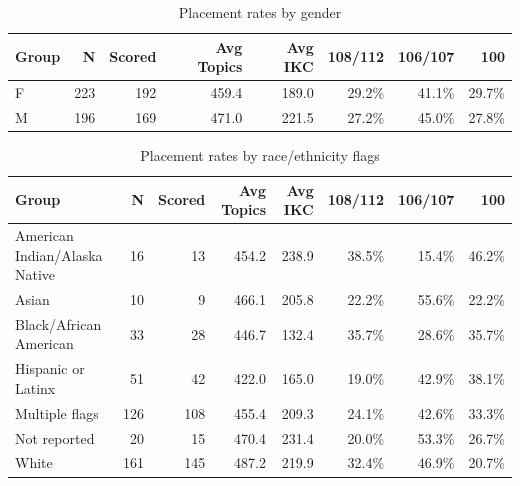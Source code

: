 \documentclass[11pt]{article}
\begin{document}
\begin{table}[htbp]
\centering
\small
\caption{Placement rates by gender}
\begin{tabular}{lrrrrrrr}
\hline
Group & N & Scored & Avg Topics & Avg IKC & 108/112 & 106/107 & 100 \\
\hline
F & 223 & 192 & 459.4 & 189.0 & 29.2\% & 41.1\% & 29.7\% \\
M & 196 & 169 & 471.0 & 221.5 & 27.2\% & 45.0\% & 27.8\% \\
\hline
\end{tabular}
\end{table}

\begin{table}[htbp]
\centering
\small
\caption{Placement rates by race/ethnicity flags}
\begin{tabular}{lrrrrrrr}
\hline
Group & N & Scored & Avg Topics & Avg IKC & 108/112 & 106/107 & 100 \\
\hline
American Indian/Alaska Native & 16 & 13 & 454.2 & 238.9 & 38.5\% & 15.4\% & 46.2\% \\
Asian & 10 & 9 & 466.1 & 205.8 & 22.2\% & 55.6\% & 22.2\% \\
Black/African American & 33 & 28 & 446.7 & 132.4 & 35.7\% & 28.6\% & 35.7\% \\
Hispanic or Latinx & 51 & 42 & 422.0 & 165.0 & 19.0\% & 42.9\% & 38.1\% \\
Multiple flags & 126 & 108 & 455.4 & 209.3 & 24.1\% & 42.6\% & 33.3\% \\
Not reported & 20 & 15 & 470.4 & 231.4 & 20.0\% & 53.3\% & 26.7\% \\
White & 161 & 145 & 487.2 & 219.9 & 32.4\% & 46.9\% & 20.7\% \\
\hline
\end{tabular}
\end{table}
\end{document}

